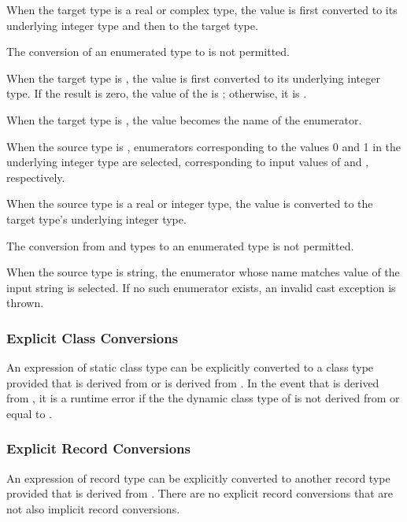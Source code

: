 When the target type is a real or complex type, the value is first converted to
its underlying integer type and then to the target type.

The conversion of an enumerated type to  is not permitted.

When the target type is , the value is first converted to its
underlying integer type.  If the result is zero, the value of the 
is ; otherwise, it is .

When the target type is , the value becomes the name of the
enumerator.  %

When the source type is , enumerators corresponding to the values 0
and 1 in the underlying integer type are selected, corresponding to input values
of  and , respectively.


When the source type is a real or integer type, the value is converted to the
target type's underlying integer type.  

The conversion from  and  types to an enumerated type is not
permitted.

When the source type is string, the enumerator whose name matches value of the input
string is selected.  If no such enumerator exists, an invalid cast exception
is thrown.

\subsubsection{Explicit Class Conversions}
\label{Explicit_Class_Conversions}

An expression of static class type  can be explicitly
converted to a class type  provided that  is derived
from  or  is derived from .  In the event
that  is derived from , it is a runtime error if the
the dynamic class type of  is not derived from or equal
to .

\subsubsection{Explicit Record Conversions}
\label{Explicit_Record_Conversions}

An expression of record type  can be explicitly converted to
another record type  provided that  is derived
from .  There are no explicit record conversions that are not
also implicit record conversions.
